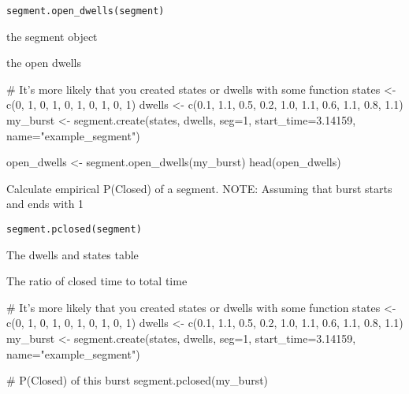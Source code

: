 \documentclass[letterpaper]{book}
\begin{document}
%
\begin{Usage}
\begin{verbatim}
segment.open_dwells(segment)
\end{verbatim}
\end{Usage}
%
\begin{Arguments}
\begin{ldescription}
\item[\code{segment}] the segment object
\end{ldescription}
\end{Arguments}
%
\begin{Value}
the open dwells
\end{Value}
%
\begin{Examples}
\begin{ExampleCode}

# It's more likely that you created states or dwells with some function
states  <-  c(0,      1,    0,    1,    0,    1,    0,    1,    0,    1)
dwells  <-  c(0.1,  1.1,  0.5,  0.2,  1.0,  1.1,  0.6,  1.1,  0.8,  1.1)
my_burst <- segment.create(states, dwells, seg=1, start_time=3.14159, name="example_segment")

open_dwells <- segment.open_dwells(my_burst)
head(open_dwells)

\end{ExampleCode}
\end{Examples}
%
\begin{Description}\relax
Calculate empirical P(Closed) of a segment. NOTE: Assuming that burst starts and ends with 1
\end{Description}
%
\begin{Usage}
\begin{verbatim}
segment.pclosed(segment)
\end{verbatim}
\end{Usage}
%
\begin{Arguments}
\begin{ldescription}
\item[\code{segment}] The dwells and states table
\end{ldescription}
\end{Arguments}
%
\begin{Value}
The ratio of closed time to total time
\end{Value}
%
\begin{Examples}
\begin{ExampleCode}

# It's more likely that you created states or dwells with some function
states  <-  c(0,      1,    0,    1,    0,    1,    0,    1,    0,    1)
dwells  <-  c(0.1,  1.1,  0.5,  0.2,  1.0,  1.1,  0.6,  1.1,  0.8,  1.1)
my_burst <- segment.create(states, dwells, seg=1, start_time=3.14159, name="example_segment")

# P(Closed) of this burst
segment.pclosed(my_burst)

\end{ExampleCode}
\end{Examples}
\end{document}
